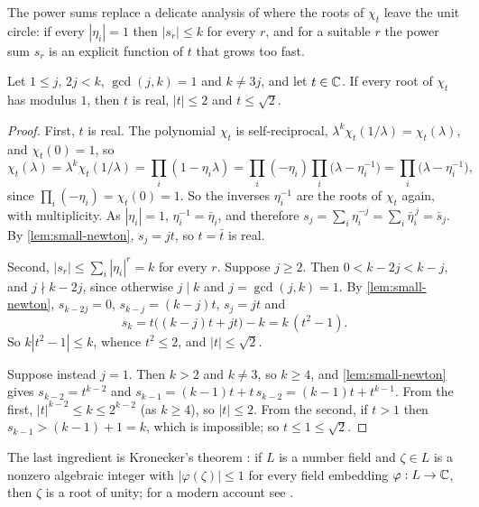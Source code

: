 The power sums replace a delicate analysis of where the roots of $\chi_t$
leave the unit circle: if every $|\eta_i|=1$ then $|s_r|\le k$ for every $r$,
and for a suitable $r$ the power sum $s_r$ is an explicit function of $t$
that grows too fast.

\begin{lemma}
\label{lem:small-bound}
Let $1\le j$, $2j<k$, $\gcd(j,k)=1$ and $k\ne3j$, and let $t\in\mathbb{C}$. If
every root of $\chi_t$ has modulus $1$, then $t$ is real, $|t|\le2$ and
$t\le\sqrt2$.
\end{lemma}

\begin{proof}
First, $t$ is real. The polynomial $\chi_t$ is self-reciprocal,
$\lambda^k\chi_t(1/\lambda)=\chi_t(\lambda)$, and $\chi_t(0)=1$, so
\[
\chi_t(\lambda)=\lambda^k\chi_t(1/\lambda)=\prod_i(1-\eta_i\lambda)
=\prod_i(-\eta_i)\prod_i\bigl(\lambda-\eta_i^{-1}\bigr)
=\prod_i\bigl(\lambda-\eta_i^{-1}\bigr),
\]
since $\prod_i(-\eta_i)=\chi_t(0)=1$. So the inverses $\eta_i^{-1}$ are the roots
of $\chi_t$ again, with multiplicity. As $|\eta_i|=1$, $\eta_i^{-1}=\bar\eta_i$,
and therefore $s_j=\sum_i\eta_i^{-j}=\sum_i\bar\eta_i^{\,j}=\bar s_j$. By
\autoref{lem:small-newton}, $s_j=jt$, so $t=\bar t$ is real.

Second, $|s_r|\le\sum_i|\eta_i|^r=k$ for every $r$. Suppose $j\ge2$. Then
$0<k-2j<k-j$, and $j\nmid k-2j$, since otherwise $j\mid k$ and
$j=\gcd(j,k)=1$. By \autoref{lem:small-newton},
$s_{k-2j}=0$, $s_{k-j}=(k-j)t$, $s_j=jt$ and
\[
s_k=t\bigl((k-j)t+jt\bigr)-k=k\,(t^2-1).
\]
So $k|t^2-1|\le k$, whence $t^2\le2$, and $|t|\le\sqrt2$.

Suppose instead $j=1$. Then $k>2$ and $k\ne3$, so $k\ge4$, and
\autoref{lem:small-newton} gives $s_{k-2}=t^{k-2}$ and
$s_{k-1}=(k-1)t+t\,s_{k-2}=(k-1)t+t^{k-1}$. From the first,
$|t|^{k-2}\le k\le2^{k-2}$ (as $k\ge4$), so $|t|\le2$. From the second, if
$t>1$ then $s_{k-1}>(k-1)+1=k$, which is impossible; so $t\le1\le\sqrt2$.
\end{proof}

The last ingredient is Kronecker's theorem \citep{Kronecker1857}: if $L$ is
a number field and $\zeta\in L$ is a nonzero algebraic integer with
$|\varphi(\zeta)|\le1$ for every field embedding $\varphi:L\to\mathbb{C}$, then
$\zeta$ is a root of unity; for a modern account see
\citet[Theorem~1.5.9]{BombieriGubler2006}.

